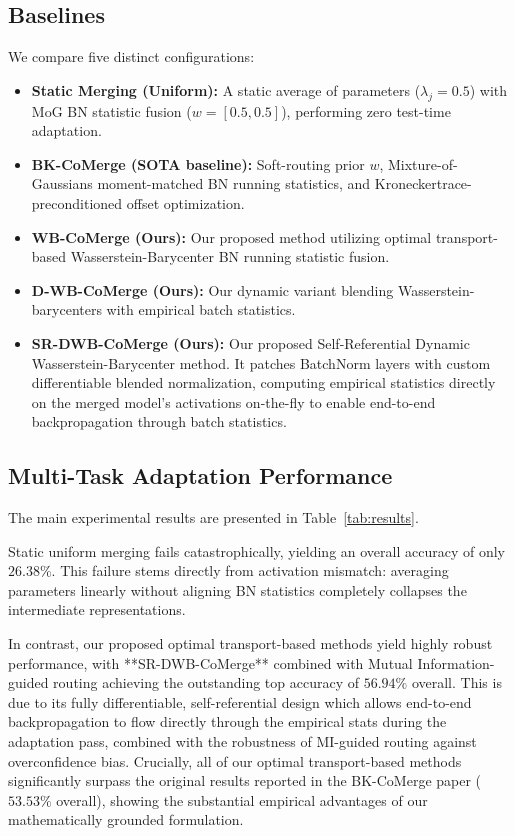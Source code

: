 \documentclass{article}
\theoremstyle{plain}
\theoremstyle{definition}
\theoremstyle{remark}
\begin{document}
\subsection{Baselines}
We compare five distinct configurations:
\begin{itemize}
  \item \textbf{Static Merging (Uniform):} A static average of parameters ($\lambda_j = 0.5$) with MoG BN statistic fusion ($w=[0.5, 0.5]$), performing zero test-time adaptation.
  \item \textbf{BK-CoMerge (SOTA baseline):} Soft-routing prior $w$, Mixture-of-Gaussians moment-matched BN running statistics, and Kroneckertrace-preconditioned offset optimization.
  \item \textbf{WB-CoMerge (Ours):} Our proposed method utilizing optimal transport-based Wasserstein-Barycenter BN running statistic fusion.
  \item \textbf{D-WB-CoMerge (Ours):} Our dynamic variant blending Wasserstein-barycenters with empirical batch statistics.
  \item \textbf{SR-DWB-CoMerge (Ours):} Our proposed Self-Referential Dynamic Wasserstein-Barycenter method. It patches BatchNorm layers with custom differentiable blended normalization, computing empirical statistics directly on the merged model's activations on-the-fly to enable end-to-end backpropagation through batch statistics.
\end{itemize}

\subsection{Multi-Task Adaptation Performance}

The main experimental results are presented in Table~\ref{tab:results}. 

Static uniform merging fails catastrophically, yielding an overall accuracy of only $26.38\%$. This failure stems directly from activation mismatch: averaging parameters linearly without aligning BN statistics completely collapses the intermediate representations.

In contrast, our proposed optimal transport-based methods yield highly robust performance, with **SR-DWB-CoMerge** combined with Mutual Information-guided routing achieving the outstanding top accuracy of $\mathbf{56.94\%}$ overall. This is due to its fully differentiable, self-referential design which allows end-to-end backpropagation to flow directly through the empirical stats during the adaptation pass, combined with the robustness of MI-guided routing against overconfidence bias. Crucially, all of our optimal transport-based methods significantly surpass the original results reported in the BK-CoMerge paper ($53.53\%$ overall), showing the substantial empirical advantages of our mathematically grounded formulation.
\end{document}
